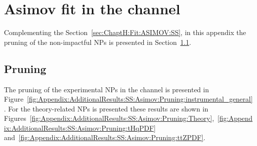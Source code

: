 \begin{comment}
\begin{figure}[h]
\centering
\begin{subfigure}{.5\textwidth}
  \centering
  \texttt{[image: Chapter5\_tHq/NPs/OS/Unblinded\_NormFactors\_statOnly]}
  \caption{Using only the statistical uncertainties.}
\end{subfigure}%
\begin{subfigure}{0.5\textwidth}
  \centering
  \texttt{[image: Chapter5\_tHq/NPs/OS/Unblinded\_NormFactors]}
  \caption{Considering all uncertainties.}
\end{subfigure}
\caption{Normalisation factors in the full-data-unblinded fit of the \dilepOStau channel.
 These results are obtained with (a) the fit considering only the statistical uncertainty and (b) the
considering all uncertainty sources.}
\label{fig:Appendix:AdditionalResults:OS:Unblinded:NormFactors}
\end{figure}

\FloatBarrier
\end{comment}


\section{Asimov fit in the \dilepSStau channel}
\label{sec:Appendix:AdditionalResults:SS:Asimov}
Complementing the Section~\ref{sec:ChaptH:Fit:ASIMOV:SS}, in this appendix
the pruning of the non-impactful NPs is presented in Section~\ref{sec:Appendix:AdditionalResults:SS:Asimov:Pruning}.

\subsection{Pruning}
\label{sec:Appendix:AdditionalResults:SS:Asimov:Pruning}


The pruning of the experimental NPs in the \dilepSStau channel 
is presented in Figure~\ref{fig:Appendix:AdditionalResults:SS:Asimov:Pruning:instrumental_general}.
For the theory-related NPs is presented these results are shown in
Figures~\ref{fig:Appendix:AdditionalResults:SS:Asimov:Pruning:Theory},~\ref{fig:Appendix:AdditionalResults:SS:Asimov:Pruning:tHqPDF} 
and~\ref{fig:Appendix:AdditionalResults:SS:Asimov:Pruning:ttZPDF}.

